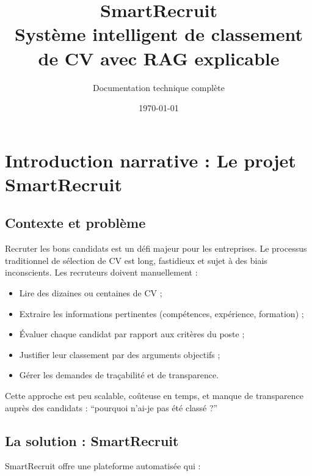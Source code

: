 \documentclass[12pt,a4paper,oneside]{book}
\title{\textbf{SmartRecruit}\\Système intelligent de classement de CV avec RAG explicable}
\author{Documentation technique complète}
\date{\today}
\begin{document}
\maketitle

\tableofcontents
\clearpage


\chapter{Introduction narrative : Le projet SmartRecruit}

\section{Contexte et problème}

Recruter les bons candidats est un défi majeur pour les entreprises. Le processus traditionnel de sélection de CV est long, fastidieux et sujet à des biais inconscients. Les recruteurs doivent manuellement :

\begin{itemize}
    \item Lire des dizaines ou centaines de CV ;
    \item Extraire les informations pertinentes (compétences, expérience, formation) ;
    \item Évaluer chaque candidat par rapport aux critères du poste ;
    \item Justifier leur classement par des arguments objectifs ;
    \item Gérer les demandes de traçabilité et de transparence.
\end{itemize}

Cette approche est peu scalable, coûteuse en temps, et manque de transparence auprès des candidats : ``pourquoi n'ai-je pas été classé ?''

\section{La solution : SmartRecruit}

SmartRecruit offre une plateforme automatisée qui :
\end{document}
